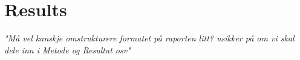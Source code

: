\chapter{Results}
\textit{"Må vel kanskje omstrukturere formatet på raporten litt? usikker på om vi skal dele inn i Metode og Resultat osv"}




